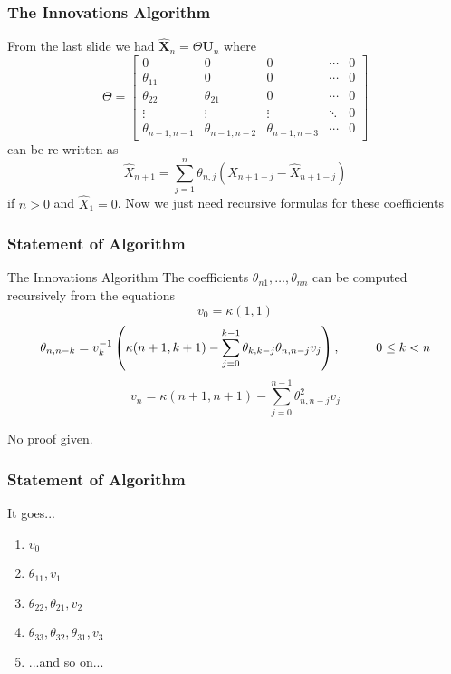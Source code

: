 \documentclass{beamer}
\begin{document}

\begin{frame}
\frametitle{The Innovations Algorithm}

From the last slide we had $\hat{\mathbf{X}}_n = \Theta \mathbf{U}_n $ where
\[
\Theta = 
\left[ \begin{array}{ccccc}
0 & 0 & 0 & \cdots & 0 \\
\theta_{11} & 0 & 0 & \cdots & 0 \\
\theta_{22} & \theta_{21} & 0 & \cdots & 0 \\
\vdots & \vdots & \vdots & \ddots & 0\\
\theta_{n-1,n-1} & \theta_{n-1,n-2} & \theta_{n-1,n-3} & \cdots & 0
\end{array}\right]
\]
can be re-written as 
\[
\hat{X}_{n+1} = \sum_{j=1}^n\theta_{n,j}(X_{n+1-j} - \hat{X}_{n+1-j})
\]
if $n > 0$ and $\hat{X}_1 = 0$. Now we just need recursive formulas for these coefficients
\end{frame}


\begin{frame}
\frametitle{Statement of Algorithm}

\begin{block}{The Innovations Algorithm}
The coefficients $\theta_{n1},\ldots,\theta_{nn}$ can be computed recursively from the equations
\[
v_0 = \kappa(1,1)
\]
\[
\theta_{n,n-k} = v_k^{-1}\left(\kappa(n+1,k+1) - \sum_{j=0}^{k-1}\theta_{k,k-j}\theta_{n,n-j} v_j \right),  \hspace{10mm} 0 \le k < n
\]
\[
v_n = \kappa(n+1,n+1) - \sum_{j=0}^{n-1}\theta_{n,n-j}^2v_j
\]
\end{block}

No proof given. 
\end{frame}



\begin{frame}
\frametitle{Statement of Algorithm}

It goes...
\begin{enumerate}
\item $v_0$
\item $\theta_{11},v_1$
\item $\theta_{22},\theta_{21},v_2$
\item $\theta_{33},\theta_{32},\theta_{31}, v_3$
\item ...and so on...
\end{enumerate}
\end{frame}
\end{document}
